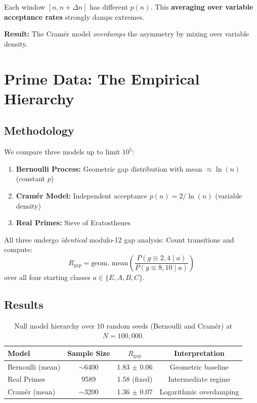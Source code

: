 \documentclass[11pt,a4paper]{article}
\theoremstyle{definition}
\theoremstyle{remark}
\begin{document}
Each window $[n, n+\Delta n]$ has different $p(n)$. This \textbf{averaging over variable acceptance rates} strongly damps extremes.

\textbf{Result:} The Cramér model \emph{overdamps} the asymmetry by mixing over variable density.

\section{Prime Data: The Empirical Hierarchy}

\subsection{Methodology}

We compare three models up to limit $10^5$:

\begin{enumerate}
\item \textbf{Bernoulli Process:} Geometric gap distribution with mean $\approx \ln(n)$ (constant $p$)
\item \textbf{Cramér Model:} Independent acceptance $p(n) = 2/\ln(n)$ (variable density)
\item \textbf{Real Primes:} Sieve of Eratosthenes
\end{enumerate}

All three undergo \emph{identical} modulo-12 gap analysis: Count transitions and compute:
\begin{equation}
R_{\text{gap}} = \text{geom.~mean}\left(\frac{P(g \equiv 2,4 \mid a)}{P(g \equiv 8,10 \mid a)}\right)
\end{equation}
over all four starting classes $a \in \{E, A, B, C\}$.

\subsection{Results}

\begin{table}[h]
\centering
\begin{tabular}{lccc}
\toprule
\textbf{Model} & \textbf{Sample Size} & \textbf{$R_{\text{gap}}$} & \textbf{Interpretation} \\
\midrule
Bernoulli (mean) & $\sim$6400 & 1.83 $\pm$ 0.06 & Geometric baseline \\
Real Primes & 9589 & 1.58 (fixed) & Intermediate regime \\
Cramér (mean) & $\sim$3200 & 1.36 $\pm$ 0.07 & Logarithmic overdamping \\
\bottomrule
\end{tabular}
\caption{Null model hierarchy over 10 random seeds (Bernoulli and Cramér) at $N=100{,}000$.}
\end{table}
\end{document}
